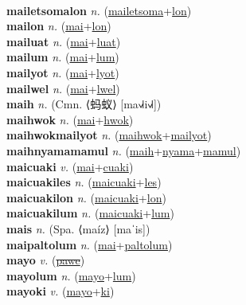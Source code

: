  \label{mailetsomales} \\
\textbf{mailetsomalon} \textit{n.} (\hyperref[mailetsoma]{mailetsoma}+\hyperref[lon]{lon})
 \label{mailetsomalon} \\
\textbf{mailon} \textit{n.} (\hyperref[mai]{mai}+\hyperref[lon]{lon})
 \label{mailon} \\
\textbf{mailuat} \textit{n.} (\hyperref[mai]{mai}+\hyperref[luat]{luat})
 \label{mailuat} \\
\textbf{mailum} \textit{n.} (\hyperref[mai]{mai}+\hyperref[lum]{lum})
 \label{mailum} \\
\textbf{mailyot} \textit{n.} (\hyperref[mai]{mai}+\hyperref[lyot]{lyot})
 \label{mailyot} \\
\textbf{mailwel} \textit{n.} (\hyperref[mai]{mai}+\hyperref[lwel]{lwel})
 \label{mailwel} \\
\textbf{maih} \textit{n.} (Cmn. ⟨蚂蚁⟩ [ma˧˩˧i˧˩˧])
 \label{maih} \\
\textbf{maihwok} \textit{n.} (\hyperref[mai]{mai}+\hyperref[hwok]{hwok})
 \label{maihwok} \\
\textbf{maihwokmailyot} \textit{n.} (\hyperref[maihwok]{maihwok}+\hyperref[mailyot]{mailyot})
 \label{maihwokmailyot} \\
\textbf{maihnyamamamul} \textit{n.} (\hyperref[maih]{maih}+\hyperref[nyama]{nyama}+\hyperref[mamul]{mamul})
 \label{maihnyamamamul} \\
\textbf{maicuaki} \textit{v.} (\hyperref[mai]{mai}+\hyperref[cuaki]{cuaki})
 \label{maicuaki} \\
\textbf{maicuakiles} \textit{n.} (\hyperref[maicuaki]{maicuaki}+\hyperref[les]{les})
 \label{maicuakiles} \\
\textbf{maicuakilon} \textit{n.} (\hyperref[maicuaki]{maicuaki}+\hyperref[lon]{lon})
 \label{maicuakilon} \\
\textbf{maicuakilum} \textit{n.} (\hyperref[maicuaki]{maicuaki}+\hyperref[lum]{lum})
 \label{maicuakilum} \\
\textbf{mais} \textit{n.} (Spa. ⟨maíz⟩ [maˈis])
 \label{mais} \\
\textbf{maipaltolum} \textit{n.} (\hyperref[mai]{mai}+\hyperref[paltolum]{paltolum})
 \label{maipaltolum} \\
\textbf{mayo} \textit{v.} (\hyperref[pawe]{\sout{pawe}})
 \label{mayo} \\
\textbf{mayolum} \textit{n.} (\hyperref[mayo]{mayo}+\hyperref[lum]{lum})
 \label{mayolum} \\
\textbf{mayoki} \textit{v.} (\hyperref[mayo]{mayo}+\hyperref[ki]{ki})
